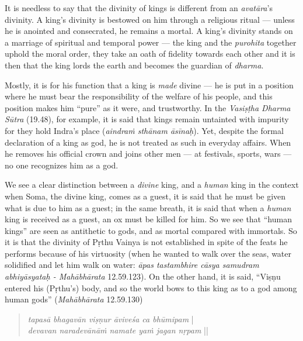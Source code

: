 It is needless to say that the divinity of kings is different from an {\sl avatāra}’s divinity. A king’s divinity is bestowed on him through a religious ritual --- unless he is anointed and consecrated, he remains a mortal. A king’s divinity stands on a marriage of spiritual and temporal power --- the king and the {\sl purohita} together uphold the moral order, they take an oath of fidelity towards each other and it is then that the king lords the earth and becomes the guardian of {\sl dharma}.

Mostly, it is for his function that a king is {\sl made} divine --- he is put in a position where he must bear the responsibility of the welfare of his people, and this position makes him “pure” as it were, and trustworthy. In the {\sl Vasiṣṭha Dharma Sūtra} (19.48), for example, it is said that kings remain untainted with impurity for they hold Indra’s place ({\sl aindraṁ sthānam āsīnaḥ}). Yet, despite the formal declaration of a king as god, he is not treated as such in everyday affairs. When he removes his official crown and joins other men --- at festivals, sports, wars --- no one recognizes him as a god.  

We see a clear distinction between a {\sl divine} king, and a {\sl human} king in the context when Soma, the divine king, comes as a guest, it is said that he must be given what is due to him as a guest; in the same breath, it is said that when a {\sl human} king is received as a guest, an ox must be killed for him.  So we see that “human kings” are seen as antithetic to gods, and as mortal compared with immortals. So it is that the divinity of Pṛthu Vainya is not established in spite of the feats he performs because of his virtuosity (when he wanted to walk over the seas, water solidified and let him walk on water: {\sl āpas tastambhire cāsya samudram abhiyāsyataḥ - Mahābhārata} 12.59.123). On the other hand, it is said, “Viṣṇu entered his (Pṛthu’s) body, and so the world bows to this king as to a god among human gods” ({\sl Mahābhārata} 12.59.130)
\begin{quote}
{\sl tapasā bhagavān viṣṇur āviveśa ca bhūmipam} |\\ 
{\sl devavan naradevānāṁ namate yaṁ jagan nṛpam} ||
\end{quote}

